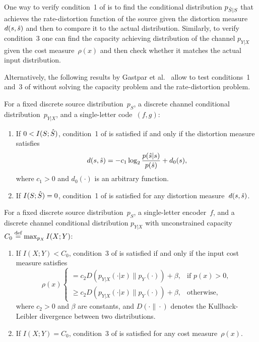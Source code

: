 One way to verify condition~1 of  is to find the
conditional distribution $p_{{\hat{S}}|S}$ that achieves the rate-distortion function
of the source given the distortion measure~$d(s,{\hat{s}})$ and then to compare it to
the actual distribution. Similarly, to verify condition~3 one can find the
capacity achieving distribution of the channel $p_{Y|X}$ given the cost
measure~$\rho(x)$ and then check whether it matches the actual input
distribution.

Alternatively, the following results by Gastpar et al.~\cite[Lemmas~2.2
and~2.3]{GastparRV2003} allow to test conditions~1 and~3 of
 without solving the capacity problem and the
rate-distortion problem.

\begin{lemma}
  \label{lem:gastparrd}
  For a fixed discrete source distribution~$p_S$, a discrete channel conditional
  distribution~$p_{Y|X}$, and a single-letter code~$(f,g)$:
  \begin{enumerate}
    \item If $0 < I(S; {\hat{S}})$, condition~1 of  is satisfied
      if and only if the distortion measure satisfies
      \begin{equation}
        \label{eq:rdmatch}
        d(s,{\hat{s}}) = -c_1 \log_2 \frac{p({\hat{s}}|s)}{p({\hat{s}})} + d_0(s),
      \end{equation}
      where $c_1 > 0$ and $d_0(\cdot)$ is an arbitrary function. 

    \item If $I(S;{\hat{S}}) = 0$, condition~1 of  is satisfied
      for any distortion measure~$d(s,{\hat{s}})$.
  \end{enumerate}
\end{lemma}

\begin{lemma}
  \label{lem:gastparcost}
  For a fixed discrete source distribution~$p_S$, a single-letter encoder~$f$,
  and a discrete channel conditional distribution $p_{Y|X}$ with unconstrained
  capacity $C_0 \stackrel{\text{def}}{=} \max_{p_X} I(X;Y)$:
  \begin{enumerate}
    \item If $I(X;Y) < C_0$, condition~3 of  is satisfied
      if and only if the input cost measure satisfies
      \begin{equation}
        \label{eq:costmatch}
        \rho(x)
        \begin{cases}
          = c_2 D(p_{Y|X}(\cdot|x) \| p_Y(\cdot)) + \beta, & 
          \text{if $p(x) > 0$}, \\
          \ge c_2 D(p_{Y|X}(\cdot|x) \| p_Y(\cdot)) + \beta, &
          \text{otherwise,}
        \end{cases}
      \end{equation}
      where $c_2 > 0$ and $\beta$ are constants, and $D(\cdot\|\cdot)$ denotes
      the Kullback-Leibler divergence between two distributions.

    \item If $I(X;Y) = C_0$, condition~3 of  is satisfied
      for any cost measure~$\rho(x)$.
  \end{enumerate}
\end{lemma}

